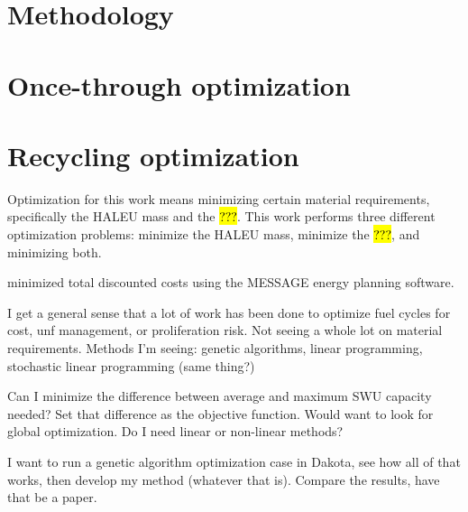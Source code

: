 \section{Methodology}

\section{Once-through optimization}

\section{Recycling optimization}

Optimization for this work means minimizing certain material requirements, 
specifically the \gls{HALEU} mass and the \hl{???}. This work performs three 
different optimization problems: minimize the \gls{HALEU} mass, minimize the 
\hl{???}, and minimizing both. 

\cite{andrianov_optimization_2019} minimized total discounted costs using 
the MESSAGE energy planning software. 

I get a general sense that a lot of work has been done to optimize fuel cycles 
for cost, unf management, or proliferation risk. Not seeing a whole lot on 
material requirements. 
Methods I'm seeing: genetic algorithms, linear programming, stochastic linear 
programming (same thing?)

Can I minimize the difference between average and maximum SWU capacity needed?
Set that difference as the objective function. Would want to look for global 
optimization. Do I need linear or non-linear methods?

I want to run a genetic algorithm optimization case in Dakota, see how all of 
that works, then develop my method (whatever that is). Compare the results, have 
that be a paper. 